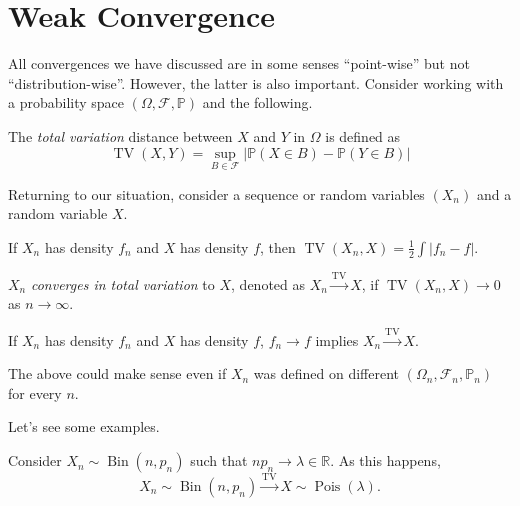 \section{Weak Convergence}
All convergences we have discussed are in some senses ``point-wise'' but not ``distribution-wise''. However, the latter is also important. Consider working with a probability space \((\Omega , \mathscr{F} , \mathbb{P} )\) and the following.

\begin{definition}\label{def:total-variation}
	The \emph{total variation} distance between \(X\) and \(Y\) in \(\Omega \) is defined as
	\[
		\operatorname{TV}(X, Y) = \sup_{B \in \mathscr{F} } \left\vert \mathbb{P} (X \in B) - \mathbb{P} (Y \in B) \right\vert
	\]
\end{definition}

Returning to our situation, consider a sequence or random variables \((X_n)\) and a random variable \(X\).

\begin{remark}
	If \(X_n\) has density \(f_n\) and \(X\) has density \(f\), then \(\operatorname{TV}(X_n, X) = \frac{1}{2} \int \vert f_n - f \vert \).
\end{remark}

\begin{definition}\label{def:convergence-in-total-variation}
	\(X_n\) \emph{converges in total variation} to \(X\), denoted as \(X_n \overset{\operatorname{TV}}{\to } X\), if \(\operatorname{TV}(X_n, X) \to 0\) as \(n \to \infty \).
\end{definition}

\begin{remark}
	If \(X_n\) has density \(f_n\) and \(X\) has density \(f\), \(f_n \to f\) implies \(X_n \overset{\operatorname{TV} }{\to } X\).
\end{remark}

\begin{note}
	The above could make sense even if \(X_n\) was defined on different \((\Omega _n , \mathscr{F} _n, \mathbb{P} _n)\) for every \(n\).
\end{note}

Let's see some examples.

\begin{eg}
	Consider \(X_n \sim \operatorname{Bin}(n, p_n) \) such that \(n p_n \to \lambda \in \mathbb{R} \). As this happens,
	\[
		X_n \sim \operatorname{Bin}(n, p_n)
		\overset{\operatorname{TV} }{\to } X \sim \operatorname{Pois}(\lambda ).
	\]
\end{eg}

